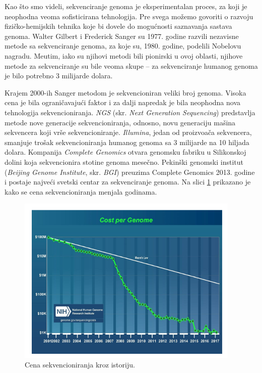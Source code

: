 Kao \v sto smo videli, sekvenciranje genoma je eksperimentalan proces, za koji je neophodna veoma sofisticirana tehnologija. Pre svega mo\v zemo govoriti o razvoju fizi\v cko-hemijskih tehnika koje bi dovele do mogu\'cnosti saznavanja sastava genoma. Walter Gilbert i Frederick Sanger su 1977. godine razvili nezavisne metode sa sekvenciranje genoma, za koje su, 1980. godine, podelili Nobelovu nagradu. Me\dj utim, iako su njihovi metodi bili pionirski u ovoj oblasti, njihove metode za sekvenciranje su bile veoma skupe -- za sekvenciranje humanog genoma je bilo potrebno 3 milijarde dolara.

Krajem 2000-ih Sanger metodom je sekvencioniran veliki broj genoma. Visoka cena je bila ograničavajući faktor i za dalji napredak je bila neophodna nova tehnologija sekvencioniranja. \emph{NGS} (skr. \emph{Next Generation Sequencing}) predstavlja metode nove generacije sekvencioniranja, odnosno, novu generaciju ma\v sina sekvencera koji vr\v se sekvencioniranje. \emph{Illumina}, jedan od proizvo\dj a\v ca sekvencera, smanjuje trošak sekvencioniranja humanog genoma sa 3 milijarde na 10 hiljada dolara. Kompanija \emph{Complete Genomics} otvara genomsku fabriku u Silikonskoj dolini koja sekvencionira stotine genoma mesečno. Pekinški genomski institut (\emph{Beijing Genome Institute}, skr. \emph{BGI}) preuzima Complete Genomics 2013. godine i postaje najveći svetski centar za sekvenciranje genoma. Na slici \ref{slika:cena} prikazano je kako se cena sekvencioniranja menjala godinama.

\begin{figure}[h]
	\centering
	\includegraphics[width=0.95\textwidth]{poglavlja/3/slike/cena_sekvencioniranja.png}
	\caption{Cena sekvencioniranja kroz istoriju.}
	\label{slika:cena}
\end{figure} 

